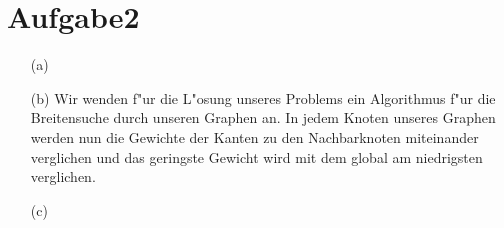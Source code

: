 \documentclass{article}
\begin{document}
\section*{Aufgabe2}
\begin{enumerate}
\item[(a)] ~
\item[(b)] Wir wenden f"ur die L"osung unseres Problems ein Algorithmus f"ur
die Breitensuche durch unseren Graphen an. In jedem Knoten unseres Graphen
werden nun die Gewichte der Kanten zu den Nachbarknoten miteinander
verglichen und das geringste Gewicht wird mit dem global am niedrigsten
verglichen.
\item[(c)] 
\end{enumerate}
\end{document}

